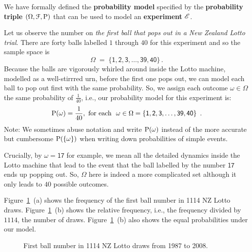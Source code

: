 We have formally defined the {\bf probability model} specified by the {\bf probability triple} $(\Omega, \C{F},\P)$ that can be used to model an {\bf experiment} $\EE{E}$.

\begin{example}\label{Eg:NZLottoModel}
Let us observe the number on {\em the first ball that pops out in a New Zealand Lotto trial}.  
There are forty balls labelled $1$ through $40$ for this experiment and so the sample space is \[\Omega\;=\;\{\mathsf{1,2,3,\dots,39,40}\}\,.\]  
Because the balls are vigorously whirled around inside the Lotto machine, modelled as a well-stirrred urn, before the first one pops out, 
we can model each ball to pop out first with the same probability. 
So, we assign each outcome $\omega \in \Omega$ the same probability of $\frac{1}{40}$, i.e., our probability model for this experiment is:
\[
\P(\omega) = \frac{1}{40}, \ \text{for each \ } \omega \in \Omega = \{\mathsf{1,2,3,\ldots,39,40}\} \enspace .
\]
Note: We sometimes abuse notation and write $\P(\omega)$ instead of the
more accurate but cumbersome $\P(\{\omega\})$ when writing down
probabilities of simple events. 

Crucially, by $\omega=\mathsf{17}$ for example, we mean all the detailed dynamics inside the Lotto machine that lead to the event that the ball labelled by the number $\mathsf{17}$ ends up popping out. 
So, $\Omega$ here is indeed a more complicated set although it only leads to $40$ possible outcomes.

Figure~\ref{F:LottoDraws}~(a) shows the frequency of the first ball number in 1114 NZ Lotto draws.  
Figure~\ref{F:LottoDraws}~(b) shows the relative frequency, i.e., the frequency divided by $1114$, the number of draws.  
Figure~\ref{F:LottoDraws}~(b) also shows the equal probabilities under our model.

\begin{figure}[htbp]
\centering
{}
\quad
{}
\caption{First ball number in 1114 NZ Lotto draws from 1987 to 2008.\label{F:LottoDraws}}
\end{figure}
\end{example}


